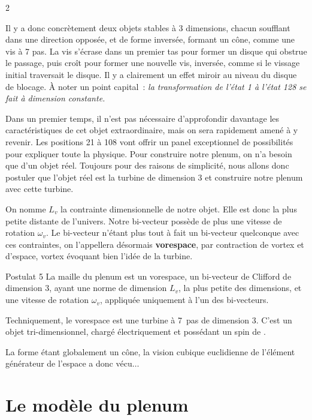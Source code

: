 \begin{multicols}{2}

Il y a donc concrètement deux objets stables à 3 dimensions, chacun
soufflant dans une direction opposée, et de forme inversée, formant un
cône, comme une vis à 7 pas. La vis s'écrase dans un premier tas pour
former un disque qui obstrue le passage, puis croît pour former une
nouvelle vis, inversée, comme si le vissage initial traversait le
disque. Il y a clairement un effet miroir au niveau du disque de
blocage. À noter un point capital :\textit{ la transformation de l'état 1 à
l'état 128 se fait à dimension constante.}

Dans un premier temps, il n'est pas nécessaire d'approfondir davantage
les caractéristiques de cet objet extraordinaire, mais on sera
rapidement amené à y revenir. Les positions 21 à 108 vont offrir un
panel exceptionnel de possibilités pour expliquer toute la physique.
Pour construire notre plenum, on n'a besoin que d'un objet réel.
Toujours pour des raisons de simplicité, nous allons donc postuler que
l'objet réel est la turbine de dimension 3 et construire notre plenum
avec cette turbine.

On nomme $L_v$ la contrainte dimensionnelle de notre objet. Elle est donc
la plus petite distante de l'univers. Notre bi-vecteur possède de plus
une vitesse de rotation $\omega_v$. Le bi-vecteur n'étant plus tout à fait un
bi-vecteur quelconque avec ces contraintes, on l'appellera désormais
\textbf{vorespace}, par contraction de vortex et d'espace, vortex évoquant bien
l'idée de la turbine.

\begin{mybox}[breakable,colback=blue!10, colbacktitle=pkcolor]{Postulat 5}
La maille du plenum est un vorespace, un bi-vecteur de Clifford de
dimension 3, ayant une norme de dimension $L_v$, la plus petite des
dimensions, et une vitesse de rotation $\omega_v$, appliquée uniquement à
l'un des bi-vecteurs.
\end{mybox}
\medskip

Techniquement, le vorespace est une turbine à 7~pas de dimension 3.
C'est un objet tri-dimensionnel, chargé électriquement et possédant un
spin de .
\medskip

La forme étant globalement un cône, la vision cubique euclidienne de
l'élément générateur de l'espace a donc vécu$\dots$


\section{Le modèle du plenum}


\end{multicols}
